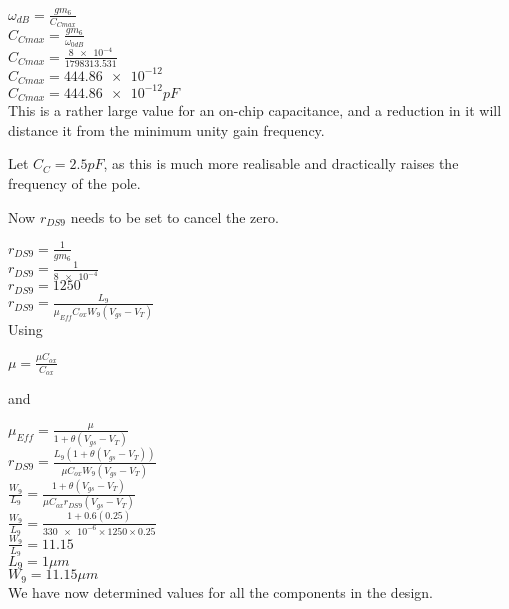 $\omega_{dB} = \frac{gm_{6}}{C_{Cmax}}$ \\
$C_{Cmax} = \frac{gm_{6}}{\omega_{0dB}}$ \\
$C_{Cmax} = \frac{\num{8e-4}}{1798313.531}$ \\
$C_{Cmax} = \num{444.86e-12}$ \\
$C_{Cmax} = \num{444.86e-12}pF$ \\

This is a rather large value for an on-chip capacitance, and a reduction in it will distance it from the minimum unity gain frequency.

Let $C_{C} = 2.5pF$, as this is much more realisable and dractically raises the frequency of the pole.

Now $r_{DS9}$ needs to be set to cancel the zero.

$r_{DS9} = \frac{1}{gm_{6}}$ \\
$r_{DS9} = \frac{1}{\num{8e-4}}$ \\
$r_{DS9} = 1250$ \\

$r_{DS9} = \frac{L_{9}}{\mu_{Eff}C_{ox}W_{9}(V_{gs} - V_{T})}$ \\

Using

$\mu = \frac{\mu C_{ox}}{C_{ox}}$

and

$\mu_{Eff} = \frac{\mu}{1 + \theta (V_{gs} - V_{T})}$ \\

$r_{DS9} = \frac{L_{9}(1 + \theta (V_{gs} - V_{T}))}{\mu C_{ox}W_{9}(V_{gs} - V_{T})}$ \\
$\frac{W_{9}}{L_{9}} = \frac{1 + \theta (V_{gs} - V_{T})}{\mu C_{ox}r_{DS9}(V_{gs} - V_{T})}$ \\
$\frac{W_{9}}{L_{9}} = \frac{1 + 0.6(0.25)}{\num{330e-6} \times 1250 \times 0.25}$ \\
$\frac{W_{9}}{L_{9}} = 11.15$ \\

$L_{9} = 1\mu m$ \\
$W_{9} = 11.15\mu m$ \\

We have now determined values for all the components in the design.
